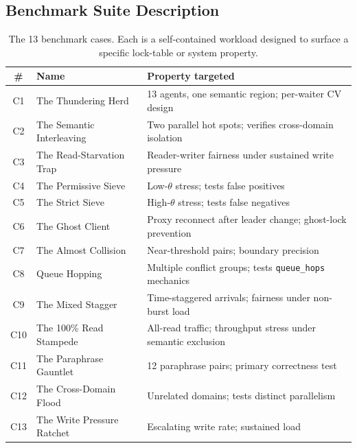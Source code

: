 \documentclass[sigconf]{acmart}
\begin{document}
\subsection{Benchmark Suite Description}
\label{sec:bench-cases}

\begin{table}[t]
  \centering
  \caption{The 13 benchmark cases. Each is a self-contained workload
    designed to surface a specific lock-table or system property.}
  \label{tab:cases}
  \scriptsize
  \begin{tabular}{cl p{4.5cm}}
    \toprule
    \# & Name & Property targeted \\
    \midrule
    C1  & The Thundering Herd       & 13 agents, one semantic region;
                                       per-waiter CV design \\
    C2  & The Semantic Interleaving & Two parallel hot spots; verifies
                                       cross-domain isolation \\
    C3  & The Read-Starvation Trap  & Reader-writer fairness under
                                       sustained write pressure \\
    C4  & The Permissive Sieve      & Low-$\theta$ stress; tests false
                                       positives \\
    C5  & The Strict Sieve          & High-$\theta$ stress; tests false
                                       negatives \\
    C6  & The Ghost Client          & Proxy reconnect after leader
                                       change; ghost-lock prevention \\
    C7  & The Almost Collision      & Near-threshold pairs; boundary
                                       precision \\
    C8  & Queue Hopping             & Multiple conflict groups; tests
                                       \texttt{queue\_hops} mechanics \\
    C9  & The Mixed Stagger         & Time-staggered arrivals; fairness
                                       under non-burst load \\
    C10 & The 100\% Read Stampede    & All-read traffic; throughput
                                       stress under semantic exclusion \\
    C11 & The Paraphrase Gauntlet   & 12 paraphrase pairs; primary
                                       correctness test \\
    C12 & The Cross-Domain Flood    & Unrelated domains; tests
                                       distinct parallelism \\
    C13 & The Write Pressure
        Ratchet                     & Escalating write rate; sustained
                                       load \\
    \bottomrule
  \end{tabular}
\end{table}
\end{document}
